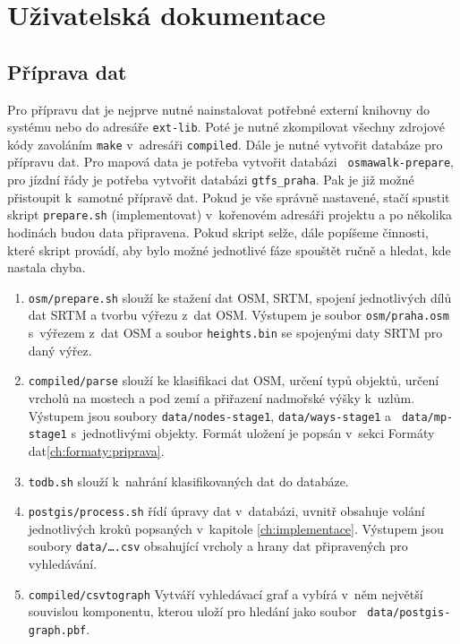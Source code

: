 \chapter{Uživatelská dokumentace}
\section{Příprava dat}
Pro přípravu dat je nejprve nutné nainstalovat potřebné externí knihovny do
systému nebo do adresáře {\tt ext-lib}. Poté je nutné zkompilovat všechny zdrojové
kódy zavoláním {\tt make} v~adresáři {\tt compiled}. Dále je nutné vytvořit databáze
pro přípravu dat. Pro mapová data je potřeba vytvořit databázi {\tt
osmawalk-prepare},
pro jízdní řády je potřeba vytvořit databázi {\tt gtfs\_praha}. Pak je již možné
přistoupit k~samotné přípravě dat. Pokud je vše správně nastavené, stačí spustit
skript {\tt prepare.sh} (\TODO implementovat) v~kořenovém adresáři projektu a po několika hodinách
budou data připravena. Pokud skript selže, dále popíšeme činnosti, které skript
provádí, aby bylo možné jednotlivé fáze spouštět ručně a hledat, kde nastala chyba.

\begin{enumerate}
\item {\tt osm/prepare.sh} slouží ke stažení dat OSM, SRTM, spojení jednotlivých
dílů dat SRTM a tvorbu výřezu z~dat OSM. Výstupem je soubor {\tt osm/praha.osm}
s~výřezem z~dat OSM a soubor {\tt heights.bin} se spojenými daty SRTM pro daný
výřez. 
\item {\tt compiled/parse} slouží ke klasifikaci dat OSM, určení typů objektů,
určení vrcholů na mostech a pod zemí a přiřazení nadmořské výšky k~uzlům.
Výstupem jsou soubory {\tt data/nodes-stage1}, {\tt data/ways-stage1} a {\tt
data/mp-stage1} s~jednotlivými objekty. Formát uložení je popsán v~sekci Formáty
dat\ref{ch:formaty:priprava}.
\item {\tt todb.sh} slouží k~nahrání klasifikovaných dat do databáze. 
\item {\tt postgis/process.sh} řídí úpravy dat v~databázi, uvnitř obsahuje
volání jednotlivých kroků popsaných v~kapitole \ref{ch:implementace}.
Výstupem jsou soubory {\tt data/\dots.csv} obsahující vrcholy a hrany dat
připravených pro vyhledávání. 
\item {\tt compiled/csvtograph} Vytváří vyhledávací graf a vybírá v~něm největší
souvislou komponentu, kterou uloží pro hledání jako soubor {\tt
data/postgis-graph.pbf}.
\end{enumerate}

